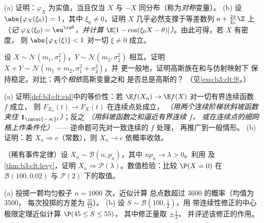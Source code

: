 \begin{exercise}[$\star\star$]\label{exo:b3:clt:2}
(a) 证明：$\varphi_X$ 为实值，当且仅当 $X$
与 $-X$ 同分布（称为\emph{对称}变量）。
(b) 设 $\abs{\varphi_X(\xi_0)} = 1$，其中 $\xi_0 \neq
0$，证明 $X$ 几乎必然支撑于等差数列
$a + \frac{2\pi}{\xi_0}\Z$ 上（\emph{记
$\varphi_X(\xi_0) = \eu^{\iu\theta}$，并计算 $\E[1 -
\cos(\xi_0X - \theta)]$）}。由此可得，若 $X$ 有密度，
则 $\abs{\varphi_X(\xi)} < 1$ 对一切 $\xi \neq 0$ 成立。
\end{exercise}

\begin{exercise}[$\star\star$]\label{exo:b3:clt:3}
设 $X \sim \mathcal N(m_1, \sigma_1^2)$，$Y \sim
\mathcal N(m_2, \sigma_2^2)$ 相互。证明 $X + Y
\sim \mathcal N(m_1 + m_2, \sigma_1^2 + \sigma_2^2)$，并
更一般地，证明高斯族在和与仿射映射下
保持稳定。对比：两个\emph{相依}高斯变量之和
是否总是高斯的？
（见\cref{exo:b3:clt:9}。）
\end{exercise}

\begin{exercise}[$\star\star$]\label{exo:b3:clt:4}
(a) 证明\cref{def:b3:clt:cid}中的等价性：若
$\E f(X_n) \to \E f(X)$ 对一切有界连续函数 $f$ 成立，
则 $F_{X_n}(t) \to F_X(t)$ 在连续点处成立，
\emph{（用两个连续阶梯状斜坡函数夹住
$\mathbf 1_{\intoc{-\infty}t}$）}；反之
\emph{（用斜坡函数之和逼近有界连续 $f$，
或在连续点的细网格上作条件化）}
——逆命题可先对一致连续的 $f$ 处理，
再推广到一般情形。
(b) 证明：若 $X_n \Rightarrow c$（常数），则 $X_n
\to c$ 依概率收敛。
\end{exercise}

\begin{exercise}[$\star\star$]\label{exo:b3:clt:5}
（稀有事件定律）设 $X_n \sim \mathcal B(n, p_n)$，其中
$np_n \to \lambda > 0$。利用
及\cref{thm:b3:clt:levy}，证明 $X_n \Rightarrow \mathcal
P(\lambda)$。数值检验：比较 $\P(X = 0)$
在 $\mathcal B(100, 0.02)$ 与 $\mathcal P(2)$ 下的取值。
\end{exercise}

\begin{exercise}[$\star\star$]\label{exo:b3:clt:6}
(a) 投掷一颗均匀骰子 $n = 1000$ 次，近似计算
总点数超过 $3600$ 的概率（均值为 $3500$，
每次投掷的方差为 $\frac{35}{12}$）。
(b) 设 $S \sim \mathcal B(100, \frac12)$，用
带连续性修正的中心极限定理近似计算 $\P(45 \leq S \leq 55)$，
其中修正量取 $\pm\frac12$，
并评述该修正的作用。
\end{exercise}

